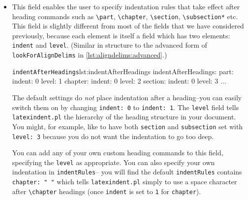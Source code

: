 \documentclass[11pt]{article}
\newcommand{\verbitem}[1]{\small\PVerb{#1}}
\begin{document}
\begin{itemize}
	\item[\verbitem{indentAfterHeadings}] This field enables the user to specify
	      indentation rules that take effect after heading commands such as \lstinline!\part!, \lstinline!\chapter!,
	      \lstinline!\section!, \lstinline!\subsection*! etc. This field is slightly different from most
	      of the fields that we have considered previously, because each element is
	      itself a field which has two elements: \lstinline!indent! and \lstinline!level!. (Similar 
          in structure to the advanced form of  \lstinline!lookForAlignDelims! in \cref{lst:aligndelims:advanced}.)
	      \begin{cmhlistings}[style=yaml]{\lstinline!indentAfterHeadings!}{lst:indentAfterHeadings}
indentAfterHeadings:
    part:
       indent: 0
       level: 1
    chapter:
       indent: 0
       level: 2
    section:
       indent: 0
       level: 3
    ...
	\end{cmhlistings}
	The default settings do \emph{not} place indentation after a heading--you
	can easily switch them on by changing \lstinline!indent: 0! to \lstinline!indent: 1!.
	The \lstinline!level! field tells \lstinline!latexindent.pl! the hierarchy of the heading
	structure in your document. You might, for example, like to have both \lstinline!section!
	and \lstinline!subsection! set with \lstinline!level: 3! because you do not want the indentation to go too deep.

	You can add any of your own custom heading commands to this field, specifying the \lstinline!level!
	as appropriate.  You can also specify your own indentation in \lstinline!indentRules!--
	you will find the default \lstinline!indentRules! contains \lstinline!chapter: " "! which
	tells \lstinline!latexindent.pl! simply to use a space character after \lstinline!\chapter! headings
	(once \lstinline!indent! is set to \lstinline!1! for \lstinline!chapter!).


\end{itemize}
\end{document}
